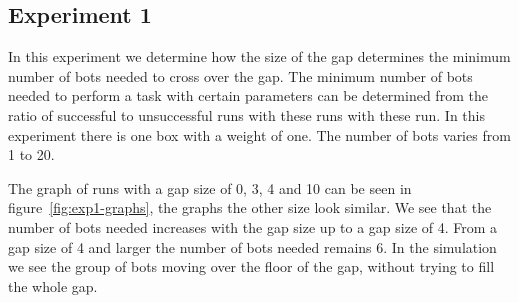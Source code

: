 \subsection{Experiment 1}
\label{ssec:exp1}

In this experiment we determine how the size of the gap determines the minimum number of
bots needed to cross over the gap. The minimum number of bots needed to perform
a task with certain parameters can be determined from the ratio of successful to
unsuccessful runs with these runs with these run. In this experiment there is
one box with a weight of one. The number of bots varies from 1 to 20.

The graph of runs with a gap size of 0, 3, 4 and 10 can be seen in
figure~\ref{fig:exp1-graphs}, the graphs the other size look similar. We see
that the number of bots needed increases with the gap size up to a gap size of
4. From a gap size of 4 and larger the number of bots needed remains 6. In the
simulation we see the group of bots moving over the floor of the gap, without
trying to fill the whole gap.

